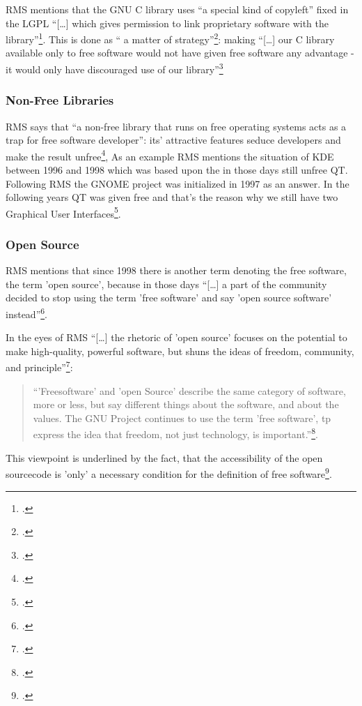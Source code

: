 \documentclass[DIV=calc,BCOR=5mm,11pt,headings=small,oneside,abstract=true, toc=bib]{scrartcl}
\begin{document}
RMS mentions that the GNU C library uses \enquote{a special kind of
copyleft} fixed in the LGPL \enquote{[\ldots] which gives permission to link
proprietary software with the library}\footcite[cf][23]{Stallman1999a}.
This is done as \enquote{ a matter of
strategy}\footcite[cf][23]{Stallman1999a}: making \enquote{[\ldots] our C
library available only to free software would not have given free software any
advantage - it would only have discouraged use of our
library}\footcite[cf][23f]{Stallman1999a}

\subsubsection{Non-Free Libraries}

RMS says that \enquote{a non-free library that runs on free operating systems acts
as a trap for free software developer}: its’ attractive features seduce
developers and make the result unfree\footcite[cf][27]{Stallman1999a}, As an
example RMS mentions the situation of KDE between 1996 and 1998 which was based
upon the in those days still unfree QT. Following RMS the GNOME project was
initialized in 1997 as an answer. In the following years QT was given free and
that’s the reason why we still have two Graphical User
Interfaces\footcite[cf][27]{Stallman1999a}.

\subsubsection{Open Source}

RMS mentions that since 1998 there is another term denoting the free software,
the term ’open source’, because in those days \enquote{[\ldots] a part of the
community decided to stop using the term ’free software’ and say ’open source
software’ instead}\footcite[cf][29]{Stallman1999a}.

In the eyes of RMS \enquote{[\ldots] the rhetoric of ’open source’ focuses on the
potential to make high-quality, powerful software, but shuns the ideas of
freedom, community, and principle}\footcite[cf][30]{Stallman1999a}:

\begin{quote}\enquote{’Freesoftware’ and ’open Source’ describe the same category
of software, more or less, but say different things about the software, and
about the values. The GNU Project continues to use the term ’free software’, tp
express the idea that freedom, not just technology, is
important.}\footcite[cf][30]{Stallman1999a}.
\end{quote}

This viewpoint is underlined by the fact, that the accessibility of the open
sourcecode is ’only’ a necessary condition for the definition of free
software\footcite[cf][18]{Stallman1999a}.


\small

\end{document}
